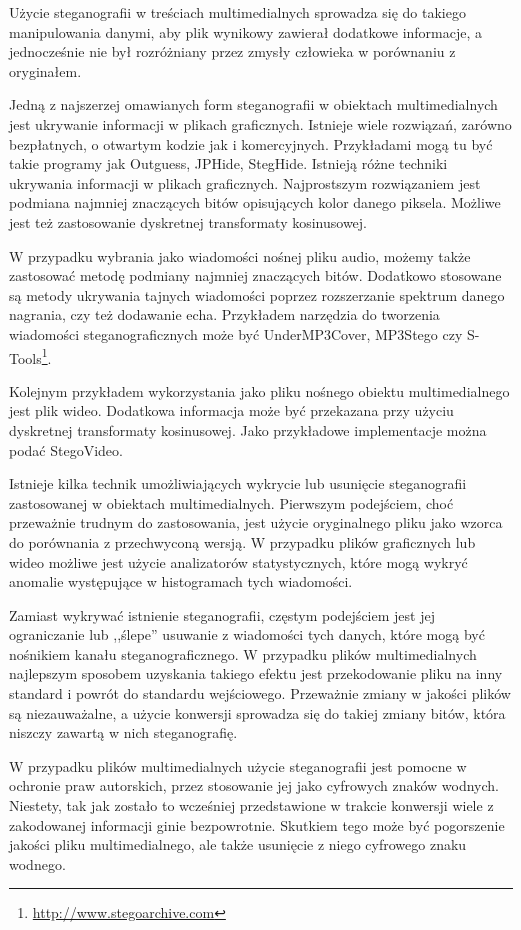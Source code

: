 \documentclass[a4paper,12pt,twoside,openany]{report}
\begin{document}
Użycie steganografii w treściach multimedialnych sprowadza się do takiego manipulowania danymi, aby plik wynikowy zawierał dodatkowe informacje, a jednocześnie nie był rozróżniany przez zmysły człowieka w porównaniu z oryginałem.

Jedną z najszerzej omawianych form steganografii w obiektach multimedialnych jest ukrywanie informacji w plikach graficznych. Istnieje wiele rozwiązań, zarówno bezpłatnych, o otwartym kodzie jak i komercyjnych. Przykładami mogą tu być takie programy jak Outguess, JPHide, StegHide. Istnieją różne techniki ukrywania informacji w plikach graficznych. Najprostszym rozwiązaniem jest podmiana najmniej znaczących bitów opisujących kolor danego piksela. Możliwe jest też zastosowanie dyskretnej transformaty kosinusowej.

W przypadku wybrania jako wiadomości nośnej pliku audio, możemy także zastosować metodę podmiany najmniej znaczących bitów. Dodatkowo stosowane są metody ukrywania tajnych wiadomości poprzez rozszerzanie spektrum danego nagrania, czy też dodawanie echa. Przykładem narzędzia do tworzenia wiadomości steganograficznych może być UnderMP3Cover, MP3Stego czy S-Tools\footnote{\url{http://www.stegoarchive.com}}.

Kolejnym przykładem wykorzystania jako pliku nośnego obiektu multimedialnego jest plik wideo. Dodatkowa informacja może być przekazana przy użyciu dyskretnej transformaty kosinusowej. Jako przykładowe implementacje można podać StegoVideo.

Istnieje kilka technik umożliwiających wykrycie lub usunięcie steganografii zastosowanej w obiektach multimedialnych. Pierwszym podejściem, choć przeważnie trudnym do zastosowania, jest użycie oryginalnego pliku jako wzorca do porównania z przechwyconą wersją. W przypadku plików graficznych lub wideo możliwe jest użycie analizatorów statystycznych, które mogą wykryć anomalie występujące w histogramach tych wiadomości.

Zamiast wykrywać istnienie steganografii, częstym podejściem jest jej ograniczanie lub ,,ślepe'' usuwanie z wiadomości tych danych, które mogą być nośnikiem kanału steganograficznego. W przypadku plików multimedialnych najlepszym sposobem uzyskania takiego efektu jest przekodowanie pliku na inny standard i powrót do standardu wejściowego. Przeważnie zmiany w jakości plików są niezauważalne, a użycie konwersji sprowadza się do takiej zmiany bitów, która niszczy zawartą w nich steganografię.

W przypadku plików multimedialnych użycie steganografii jest pomocne w ochronie praw autorskich, przez stosowanie jej jako cyfrowych znaków wodnych. Niestety, tak jak zostało to wcześniej przedstawione w trakcie konwersji wiele z zakodowanej informacji ginie bezpowrotnie. Skutkiem tego może być pogorszenie jakości pliku multimedialnego, ale także usunięcie z niego cyfrowego znaku wodnego.
\end{document}
